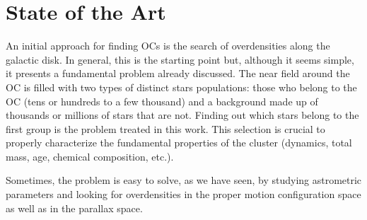\documentclass[11pt, a4paper, english]{book}
\begin{document}
\chapter{State of the Art}


An initial approach for finding OCs is the search of overdensities along the galactic disk. In general, this is the starting point but,
although it seems simple, it presents a fundamental problem already discussed. The near field around the OC is filled with two types of
distinct stars populations: those who belong to the OC (tens or hundreds to a few thousand) and a background made up of thousands or
millions of stars that are not. Finding out which stars belong to the first group is the problem treated in this work.
This selection is crucial to properly characterize the fundamental properties of the cluster
(dynamics, total mass, age, chemical composition, etc.).

Sometimes, the problem is easy to solve, as we have seen, by studying astrometric parameters and looking for overdensities in the proper
motion configuration space as well as in the parallax space.
\end{document}
